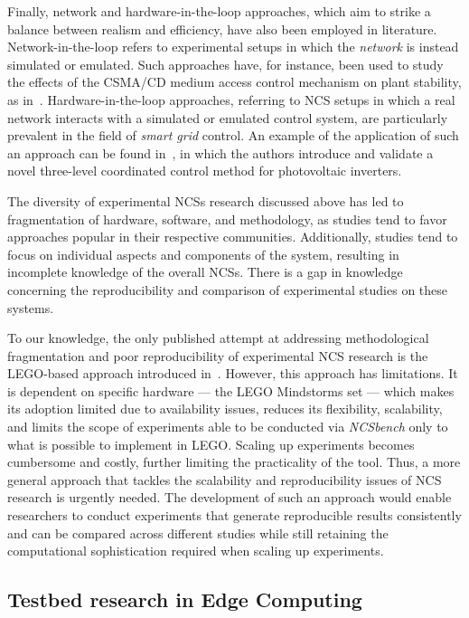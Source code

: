 Finally, network and hardware-in-the-loop approaches, which aim to strike a balance between realism and efficiency, have also been employed in literature.
Network-in-the-loop refers to experimental setups in which the \emph{network} is instead simulated or emulated.
Such approaches have, for instance, been used to study the effects of the \gls{CSMA/CD} medium access control mechanism on plant stability, as in~\cite{natale2004inverted}.
Hardware-in-the-loop approaches, referring to \gls{NCS} setups in which a real network interacts with a simulated or emulated control system, are particularly prevalent in the field of \emph{smart grid} control.
An example of the application of such an approach can be found in~\cite{wang2020inverter}, in which the authors introduce and validate a novel three-level coordinated control method for photovoltaic inverters.

\medskip

The diversity of experimental \glspl{NCS} research discussed above has led to fragmentation of hardware, software, and methodology, as studies tend to favor approaches popular in their respective communities.
Additionally, studies tend to focus on individual aspects and components of the system, resulting in incomplete knowledge of the overall \glspl{NCS}.
There is a gap in knowledge concerning the reproducibility and comparison of experimental studies on these systems.

To our knowledge, the only published attempt at addressing methodological fragmentation and poor reproducibility of experimental \gls{NCS} research is the LEGO-based approach introduced in~\cite{zoppi2020ncsbench}.
However, this approach has limitations.
It is dependent on specific hardware --- the LEGO Mindstorms set --- which makes its adoption limited due to availability issues, reduces its flexibility, scalability, and limits the scope of experiments able to be conducted via \emph{NCSbench} only to what is possible to implement in LEGO.\@
Scaling up experiments becomes cumbersome and costly, further limiting the practicality of the tool.
Thus, a more general approach that tackles the scalability and reproducibility issues of NCS research is urgently needed.
The development of such an approach would enable researchers to conduct experiments that generate reproducible results consistently and can be compared across different studies while still retaining the computational sophistication required when scaling up experiments.

\subsection{Testbed research in Edge Computing}

